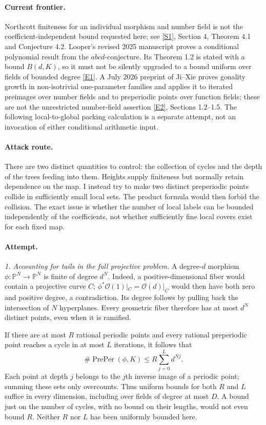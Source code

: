 \documentclass[11pt,a4paper]{article}
\newcommand{\PP}{\mathbb P}
\newcommand{\sref}[2]{\hyperlink{source:#1:#2}{[S#2]}}
\newcommand{\eref}[2]{\hyperlink{extra:#1:#2}{[E#2]}}
\begin{document}
\paragraph{Current frontier.}
Northcott finiteness for an individual morphism and number field is not the
coefficient-independent bound requested here; see \sref{212}{1}, Section 4,
Theorem 4.1 and Conjecture 4.2. Looper's revised 2025 manuscript proves a
conditional polynomial result from the $abcd$-conjecture. Its Theorem 1.2 is
stated with a bound $B(d,K)$, so it must not be silently upgraded to a bound
uniform over fields of bounded degree \eref{212}{1}. A July 2026 preprint of
Ji--Xie proves gonality growth in non-isotrivial one-parameter families and
applies it to iterated preimages over number fields and to preperiodic points
over function fields; these are not the unrestricted number-field assertion
\eref{212}{2}, Sections 1.2--1.5. The following local-to-global packing
calculation is a separate attempt, not an invocation of either conditional
arithmetic input.

\paragraph{Attack route.}
There are two distinct quantities to control: the collection of cycles and
the depth of the trees feeding into them. Heights supply finiteness but
normally retain dependence on the map. I instead try to make two distinct
preperiodic points collide in sufficiently small local sets. The product
formula would then forbid the collision. The exact issue is whether the
number of local labels can be bounded independently of the coefficients,
not whether sufficiently fine local covers exist for each fixed map.

\paragraph{Attempt.}
\textit{1. Accounting for tails in the full projective problem.}
A degree-$d$ morphism $\phi:\PP^N\to\PP^N$ is finite of degree $d^N$.
Indeed, a positive-dimensional fiber would contain a projective curve $C$;
$\phi^*\mathcal O(1)|_C=\mathcal O(d)|_C$ would then have both zero and
positive degree, a contradiction. Its degree follows by pulling back the
intersection of $N$ hyperplanes. Every geometric fiber therefore has at most
$d^N$ distinct points, even when it is ramified.

If there are at most $R$ rational periodic points and every rational
preperiodic point reaches a cycle in at most $L$ iterations, it follows that
\[
 \#\operatorname{PrePer}(\phi,K)
 \le R\sum_{j=0}^{L}d^{Nj}.                                    \tag{212.1}
\]
Each point at depth $j$ belongs to the $j$th inverse image of a periodic
point; summing these sets only overcounts. Thus uniform bounds for both
$R$ and $L$ suffice in every dimension, including over fields of degree at
most $D$. A bound just on the number of cycles, with no bound on their
lengths, would not even bound $R$. Neither $R$ nor $L$ has been uniformly
bounded here.
\end{document}
